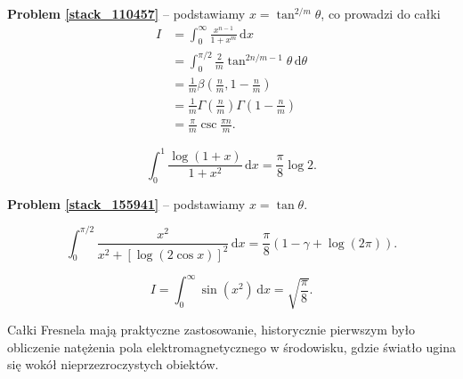 \textbf{Problem \ref{stack_110457}} -- podstawiamy $x = \tan^{2/m} \theta$, co prowadzi do całki
\begin{align}
    I & = \int_0^\infty \frac{x^{n-1}}{1 + x^m} \,\mathrm{d} x \\
      & = \int_0^{\pi/2} \frac 2 m \tan^{2n/m - 1} \theta \,\mathrm{d}\theta \\
      & = \frac 1 m \beta\left( \frac nm, 1 - \frac nm \right) \\
      & = \frac 1 m \Gamma \left(\frac nm\right) \Gamma \left(1 - \frac nm\right) \\
      & = \frac \pi m \operatorname{csc} \frac {\pi n}{m}.
\end{align}


\begin{problem_with_solution}[pytanie 155941]
    \label{stack_155941}%
    \begin{equation}
        \int_0^1 \frac{\log (1+x)}{1 + x^2} \,\mathrm{d}x = \frac \pi 8  \log 2.
    \end{equation}
\end{problem_with_solution}

\textbf{Problem \ref{stack_155941}} -- podstawiamy $x = \tan \theta$.


\begin{problem}[pytanie 178790]
    \label{stack_178790}%
    \begin{equation}
        \int_0^{\pi/2} \frac{x^2}{x^2 + [\log (2 \cos x)]^2} \,\mathrm{d}x = \frac{\pi}{8} (1 - \gamma + \log (2 \pi)).
    \end{equation}
\end{problem}


\begin{problem_with_solution}
    \label{stack_187729}%
    \begin{equation}
        I = \int_0^\infty \sin (x^2) \,\mathrm{d} x = \sqrt{\frac \pi 8}.
    \end{equation}
\end{problem_with_solution}

Całki Fresnela mają praktyczne zastosowanie, historycznie pierwszym było obliczenie natężenia pola elektromagnetycznego w środowisku, gdzie światło ugina się wokół nieprzezroczystych obiektów.
%


